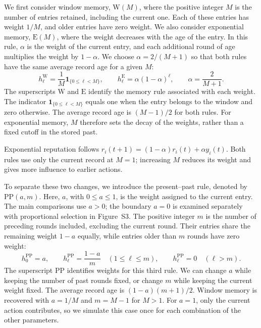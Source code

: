 \documentclass[physics,article,submit,moreauthors]{Definitions/mdpi}
\newcommand{\W}{\mathrm{W}}
\newcommand{\E}{\mathrm{E}}
\newcommand{\PP}{\mathrm{PP}}
\begin{document}
We first consider window memory, $\W(M)$, where the positive integer $M$ is the number of entries retained, including the current one. Each of these entries has weight $1/M$, and older entries have zero weight. We also consider exponential memory, $\E(M)$, where the weight decreases with the age of the entry. In this rule, $\alpha$ is the weight of the current entry, and each additional round of age multiplies the weight by $1-\alpha$. We choose $\alpha=2/(M+1)$ so that both rules have the same average record age for a given $M$:
\begin{equation}
 h_\ell^{\W}=\frac{1}{M}\mathbf{1}_{\{0\leq\ell<M\}},\qquad
 h_\ell^{\E}=\alpha(1-\alpha)^\ell,\qquad
 \alpha=\frac{2}{M+1}.
 \label{eq:kernels}
\end{equation}
The superscripts $\W$ and $\E$ identify the memory rule associated with each weight. The indicator $\mathbf{1}_{\{0\leq\ell<M\}}$ equals one when the entry belongs to the window and zero otherwise. The average record age is $(M-1)/2$ for both rules. For exponential memory, $M$ therefore sets the decay of the weights, rather than a fixed cutoff in the stored past.

Exponential reputation follows $r_i(t+1)=(1-\alpha)r_i(t)+\alpha y_i(t)$. Both rules use only the current record at $M=1$; increasing $M$ reduces its weight and gives more influence to earlier actions.

To separate these two changes, we introduce the present--past rule, denoted by $\PP(a,m)$. Here, $a$, with $0\leq a\leq1$, is the weight assigned to the current entry. The main comparisons use $a>0$; the boundary $a=0$ is examined separately with proportional selection in Figure~S3. The positive integer $m$ is the number of preceding rounds included, excluding the current round. Their entries share the remaining weight $1-a$ equally, while entries older than $m$ rounds have zero weight:
\begin{equation}
 h_0^{\PP}=a,\qquad
 h_\ell^{\PP}=\frac{1-a}{m}\quad(1\leq\ell\leq m),\qquad
 h_\ell^{\PP}=0\quad(\ell>m).
 \label{eq:pp}
\end{equation}
The superscript $\PP$ identifies weights for this third rule. We can change $a$ while keeping the number of past rounds fixed, or change $m$ while keeping the current weight fixed. The average record age is $(1-a)(m+1)/2$. Window memory is recovered with $a=1/M$ and $m=M-1$ for $M>1$. For $a=1$, only the current action contributes, so we simulate this case once for each combination of the other parameters.
\end{document}
